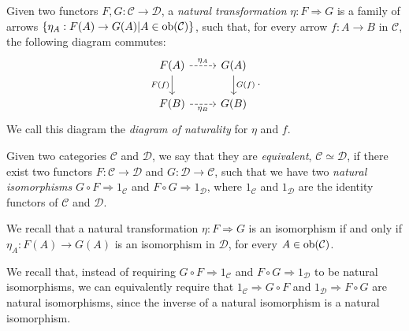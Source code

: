 \begin{definition}
    Given two functors $F,G : \mathcal C \to \mathcal D$, a \emph{natural transformation} $\eta : F \Rightarrow G$ is a family of arrows $\{\eta_A : F(A) \to G(A) | A \in \operatorname{ob}(\mathcal C)\}$,
    such that, for every arrow $f : A \to B$ in $\mathcal C$, the following diagram commutes:
    \[\begin{tikzcd}
        {F(A)} & {G(A)} \\
        {F(B)} & {G(B)}
        \arrow["{\eta_A}", dashed, from=1-1, to=1-2]
        \arrow["{F(f)}"', from=1-1, to=2-1]
        \arrow["{G(f)}", from=1-2, to=2-2]
        \arrow["{\eta_B}"', dashed, from=2-1, to=2-2]
    \end{tikzcd}.\]
    We call this diagram the \emph{diagram of naturality} for $\eta$ and $f$.
\end{definition}

\begin{definition}
    Given two categories $\mathcal C$ and $\mathcal D$, we say that they are \emph{equivalent}, $\mathcal C \simeq \mathcal D$, if there exist two functors $F : \mathcal C \to \mathcal D$ and $G : \mathcal D \to \mathcal C$,
    such that we have two \emph{natural isomorphisms} $G \circ F \Rightarrow 1_{\mathcal C}$ and $F \circ G \Rightarrow 1_{\mathcal D}$, where $1_{\mathcal C}$ and $1_{\mathcal D}$ are the identity functors of $\mathcal C$ and $\mathcal D$.
\end{definition}

\begin{remark}
    We recall that a natural transformation $\eta : F \Rightarrow G$ is an isomorphism if and only if $\eta_A : F(A) \to G(A)$ is an isomorphism in $\mathcal D$, for every $A \in \operatorname{ob}(\mathcal C)$.
\end{remark}

\begin{remark}
    We recall that, instead of requiring $G \circ F \Rightarrow 1_{\mathcal C}$ and $F \circ G \Rightarrow 1_{\mathcal D}$ to be natural isomorphisms, we can equivalently require that
    $1_{\mathcal C} \Rightarrow G \circ F$ and $1_{\mathcal D} \Rightarrow F \circ G$ are natural isomorphisms, since the inverse of a natural isomorphism is a natural isomorphism.
\end{remark}

